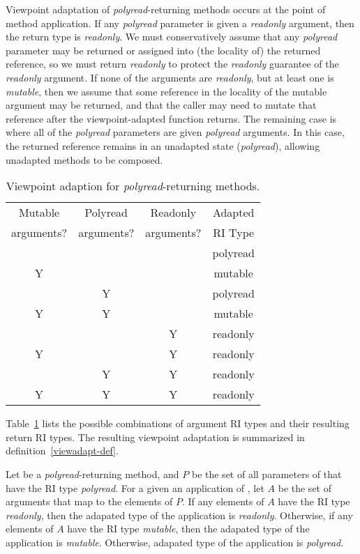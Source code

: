 Viewpoint adaptation of \emph{polyread}-returning methods
occurs at the point of method application.
If any \emph{polyread} parameter is given a \emph{readonly} argument,
then the return type is \emph{readonly}.
We must conservatively assume that any \emph{polyread} parameter may be
returned or assigned into (the locality of) the returned reference,
so we must return \emph{readonly} to protect the \emph{readonly} guarantee
of the \emph{readonly} argument.
If none of the arguments are \emph{readonly}, but at least one is \emph{mutable},
then we assume that some reference in the locality of the mutable argument may
be returned, and that the caller may need to mutate that reference after
the viewpoint-adapted function returns.
The remaining case is where all of the \emph{polyread} parameters are given
\emph{polyread} arguments.
In this case, the returned reference remains in an unadapted state (\emph{polyread}),
allowing unadapted methods to be composed.

\begin{table}
	\begin{center}
	\begin{tabular}{ccc|c}
	Mutable    & Polyread   & Readonly   & Adapted \\
	arguments? & arguments? & arguments? & RI Type \\
	\hline
	   &   &   & polyread \\
	 Y &   &   & mutable \\
	   & Y &   & polyread \\
	 Y & Y &   & mutable \\
	   &   & Y & readonly \\
	 Y &   & Y & readonly \\
	   & Y & Y & readonly \\
	 Y & Y & Y & readonly \\
	\end{tabular}
	\end{center}
	\caption{Viewpoint adaption for \emph{polyread}-returning methods.}
	\label{viewadapt-methods}
\end{table}

Table~\ref{viewadapt-methods} lists the possible combinations of argument RI types
and their resulting return RI types.
The resulting viewpoint adaptation is summarized in definition~\ref{viewadapt-def}.

\begin{definition}
	\label{viewadapt-def}
	Let  be a \emph{polyread}-returning method, and $P$ be the set of all
	parameters of  that have the RI type \emph{polyread}.
	For a given an application of , let $A$ be the set of arguments that
	map to the elements of $P$.
	If any elements of $A$ have the RI type \emph{readonly}, then
	the adapated type of the application is \emph{readonly}.
	Otherwise, if any elements of $A$ have the RI type \emph{mutable}, then
	the adapated type of the application is \emph{mutable}.
	Otherwise, adapated type of the application is \emph{polyread}.
\end{definition}

